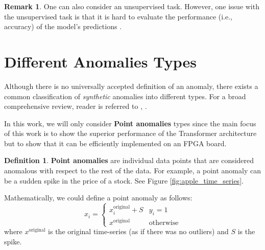 \documentclass[a4paper, twoside]{report}
\theoremstyle{definition}
\newtheorem{definition}[theorem]{Definition}
\newtheorem{remark}[theorem]{Remark}
\numberwithin{equation}{section}
\begin{document}
\begin{remark}
    One can also consider an unsupervised task.
    However, one issue with the unsupervised task is that it is hard to evaluate
    the performance (i.e., accuracy) of the model's predictions \cite{1905.05667}.
\end{remark}


\section{Different Anomalies Types}

Although there is no universally accepted definition of an anomaly,
there exists a common classification of \textit{synthetic} anomalies into different types. For a broad comprehensive review,
reader is referred to \cite{Steinbuss2020GeneratingAO}, \cite{Schmidl2022AnomalyDI}.

In this work, we will only consider \textbf{Point anomalies} types since
the main focus of this work is to show the superior performance of the Transformer architecture
but to show that it can be efficiently implemented on an FPGA board.

\begin{definition}
    \textbf{Point anomalies} are individual data points that are considered anomalous with respect to the rest of the data.
    For example, a point anomaly can be a sudden spike in the price of a stock. See Figure \ref{fig:apple_time_series}.

    Mathematically, we could define a point anomaly as follows:
    \begin{equation}
        x_i = \begin{cases}
            x^{\text{original}}_i + S & y_i=1            \\
            x^{\text{original}}       & \text{otherwise}
        \end{cases}
    \end{equation}
    where $x^{\text{original}}$ is the original time-series (as if there was no outliers)
    and $S$ is the spike.

\end{definition}
\end{document}
